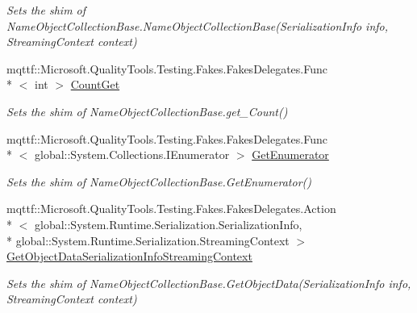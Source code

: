 \begin{DoxyCompactItemize}
\begin{DoxyCompactList}\small\item\em Sets the shim of Name\-Object\-Collection\-Base.\-Name\-Object\-Collection\-Base(\-Serialization\-Info info, Streaming\-Context context)\end{DoxyCompactList}\item 
mqttf\-::\-Microsoft.\-Quality\-Tools.\-Testing.\-Fakes.\-Fakes\-Delegates.\-Func\\*
$<$ int $>$ \hyperlink{class_system_1_1_collections_1_1_specialized_1_1_fakes_1_1_shim_name_object_collection_base_ad32c596db5b346e190816c561a309111}{Count\-Get}
\begin{DoxyCompactList}\small\item\em Sets the shim of Name\-Object\-Collection\-Base.\-get\-\_\-\-Count()\end{DoxyCompactList}\item 
mqttf\-::\-Microsoft.\-Quality\-Tools.\-Testing.\-Fakes.\-Fakes\-Delegates.\-Func\\*
$<$ global\-::\-System.\-Collections.\-I\-Enumerator $>$ \hyperlink{class_system_1_1_collections_1_1_specialized_1_1_fakes_1_1_shim_name_object_collection_base_ae1ccd97fd93cb3f84bd15c437eea1455}{Get\-Enumerator}
\begin{DoxyCompactList}\small\item\em Sets the shim of Name\-Object\-Collection\-Base.\-Get\-Enumerator()\end{DoxyCompactList}\item 
mqttf\-::\-Microsoft.\-Quality\-Tools.\-Testing.\-Fakes.\-Fakes\-Delegates.\-Action\\*
$<$ global\-::\-System.\-Runtime.\-Serialization.\-Serialization\-Info, \\*
global\-::\-System.\-Runtime.\-Serialization.\-Streaming\-Context $>$ \hyperlink{class_system_1_1_collections_1_1_specialized_1_1_fakes_1_1_shim_name_object_collection_base_a309ddda5bf9fab70f0deba19f4c90504}{Get\-Object\-Data\-Serialization\-Info\-Streaming\-Context}
\begin{DoxyCompactList}\small\item\em Sets the shim of Name\-Object\-Collection\-Base.\-Get\-Object\-Data(\-Serialization\-Info info, Streaming\-Context context)\end{DoxyCompactList}\item 

\end{DoxyCompactItemize}
